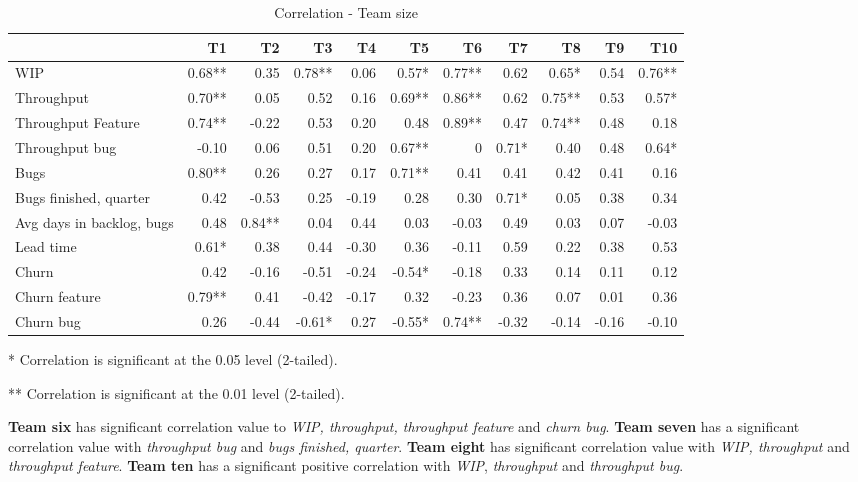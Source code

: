 \documentclass[UKenglish]{ifimaster}  %
\begin{document}
 \begin{table}[!htbp]
  \begin{adjustwidth}{-2.5cm}{}
 \centering
 \begin{tabular}{|l|r|r|r|r|r|r|r|r|r|r|}
\hline
 & \bf{T1} & \bf{T2} & \bf{T3} & \bf{T4} & \bf{T5} & \bf{T6} & \bf{T7} & \bf{T8} & \bf{T9} & \bf{T10}\\ \hline
 WIP  & 0.68** & 0.35 & 0.78** & 0.06 & 0.57* & 0.77** & 0.62 & 0.65* & 0.54 & 0.76** \\ \hline
 Throughput  & 0.70** & 0.05 & 0.52 & 0.16 & 0.69** & 0.86** & 0.62 & 0.75** & 0.53 & 0.57* \\ \hline
 Throughput Feature  & 0.74** & -0.22 & 0.53 & 0.20 & 0.48 & 0.89** & 0.47 & 0.74** & 0.48 & 0.18 \\ \hline
 Throughput bug  & -0.10 & 0.06 & 0.51 & 0.20 & 0.67** & 0 &0.71* & 0.40 & 0.48 & 0.64* \\ \hline
 Bugs  & 0.80** & 0.26 & 0.27 & 0.17 & 0.71** & 0.41 & 0.41 & 0.42 & 0.41 & 0.16 \\ \hline
 Bugs finished, quarter  & 0.42 & -0.53 & 0.25 & -0.19 & 0.28 & 0.30 & 0.71* & 0.05 & 0.38 & 0.34 \\ \hline
 Avg days in backlog, bugs  & 0.48 & 0.84** & 0.04 & 0.44 & 0.03 & -0.03 & 0.49 & 0.03 & 0.07 & -0.03 \\ \hline
 Lead time  & 0.61* & 0.38 & 0.44 & -0.30 & 0.36 & -0.11 & 0.59 & 0.22 & 0.38 & 0.53 \\ \hline
 Churn  & 0.42 & -0.16 & -0.51 & -0.24 & -0.54* & -0.18 & 0.33 & 0.14 & 0.11 & 0.12 \\ \hline
 Churn feature  & 0.79** & 0.41 & -0.42 & -0.17 & 0.32 & -0.23 & 0.36 & 0.07 & 0.01 & 0.36 \\ \hline
 Churn bug  & 0.26 & -0.44 & -0.61* & 0.27 & -0.55* & 0.74** & -0.32 & -0.14 & -0.16 & -0.10 \\ \hline
\end{tabular}
 \caption{Correlation - Team size}
 \label{corr:Teams}
 \centerline {* Correlation is significant at the 0.05 level (2-tailed).}
\centerline{** Correlation is significant at the 0.01 level (2-tailed).}
\end{adjustwidth}
\end{table}
\textbf{Team six} has significant correlation value to \textit{WIP, throughput, throughput feature} and \textit{churn bug}. \textbf{Team seven} has a significant correlation value with \textit{throughput bug} and \textit{bugs finished, quarter}. \textbf{Team eight} has significant correlation value with \textit{WIP, throughput} and \textit{throughput feature}. \textbf{Team ten} has a significant positive correlation with  \textit{WIP}, \textit{throughput} and \textit{throughput bug}. 
\end{document}
